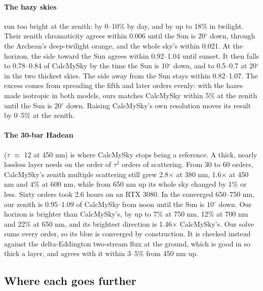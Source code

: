 \documentclass[9pt,twocolumn]{extarticle}
\begin{document}
\paragraph{The hazy skies} run too bright at the zenith: by 0--10\% by day, and by up to 18\% in twilight. Their zenith chromaticity agrees within 0.006 until the Sun is 20$^\circ$ down, through the Archean's deep-twilight orange, and the whole sky's within 0.021. At the horizon, the side toward the Sun agrees within 0.92--1.04 until sunset. It then falls to 0.78--0.84 of CalcMySky by the time the Sun is 10$^\circ$ down, and to 0.5--0.7 at 20$^\circ$ in the two thickest skies. The side away from the Sun stays within 0.82--1.07. The excess comes from spreading the fifth and later orders evenly: with the hazes made isotropic in both models, ours matches CalcMySky within 5\% at the zenith until the Sun is 20$^\circ$ down. Raising CalcMySky's own resolution moves its result by 0--5\% at the zenith.

\paragraph{The 30-bar Hadean} ($\tau$ $\approx$ 12 at 450 nm) is where CalcMySky stops being a reference. A thick, nearly lossless layer needs on the order of $\tau^{2}$ orders of scattering. From 30 to 60 orders, CalcMySky's zenith multiple scattering still grew 2.8$\times$ at 380 nm, 1.6$\times$ at 450 nm and 4\% at 600 nm, while from 650 nm up its whole sky changed by 1\% or less. Sixty orders took 2.6 hours on an RTX 3080. In the converged 650--750 nm, our zenith is 0.95--1.09 of CalcMySky from noon until the Sun is 10$^\circ$ down. Our horizon is brighter than CalcMySky's, by up to 7\% at 750 nm, 12\% at 700 nm and 22\% at 650 nm, and its brightest direction is 1.46$\times$ CalcMySky's. Our solve sums every order, so its blue is converged by construction. It is checked instead against the delta-Eddington two-stream flux at the ground, which is good in so thick a layer, and agrees with it within 3--5\% from 450 nm up.

\subsection*{Where each goes further}
\end{document}

